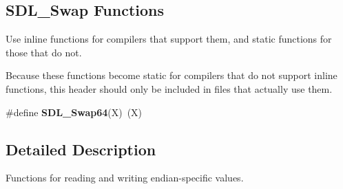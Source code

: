 \subsection*{S\+D\+L\+\_\+\+Swap Functions}
\label{_amgrp968b97fa28abb0c5b2838d418c0fd83f}%
Use inline functions for compilers that support them, and static functions for those that do not.

Because these functions become static for compilers that do not support inline functions, this header should only be included in files that actually use them. \begin{DoxyCompactItemize}
\item 
\#define {\bfseries S\+D\+L\+\_\+\+Swap64}(X)~(X)\label{_s_d_l__endian_8h_a970862b2724f36e7c52fda401022b669}

\end{DoxyCompactItemize}


\subsection{Detailed Description}
Functions for reading and writing endian-\/specific values. 


